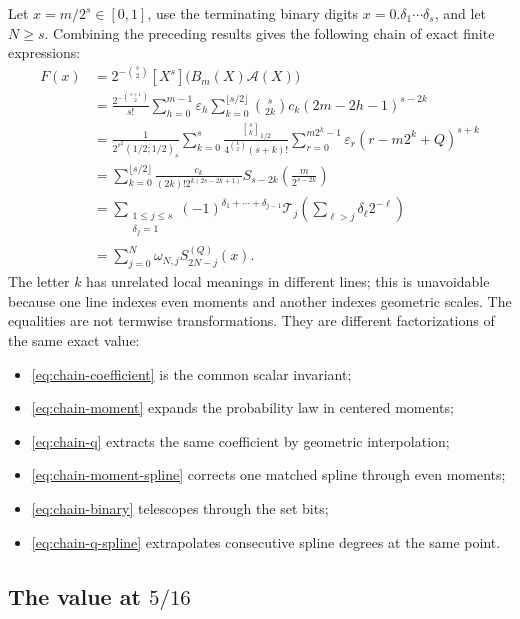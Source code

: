 \documentclass[11pt,oneside]{article}
\theoremstyle{definition}
\theoremstyle{remark}
\newcommand{\qbinom}[3]{\genfrac{[}{]}{0pt}{}{#1}{#2}_{#3}}
\newcommand{\tm}{\varepsilon}
\begin{document}
Let $x=m/2^s\in[0,1]$, use the terminating binary digits
$x=0.\delta_1\cdots\delta_s$, and let $N\ge s$.  Combining the preceding results gives the
following chain of exact finite expressions:
\begin{align}
 F(x)
 &=2^{-\binom s2}[X^s]\bigl(B_m(X)\mathscr A(X)\bigr)     \label{eq:chain-coefficient}\\
 &=\frac{2^{-\binom{s+1}{2}}}{s!}
   \sum_{h=0}^{m-1}\tm_h
   \sum_{k=0}^{\lfloor s/2\rfloor}
   \binom s{2k}c_k(2m-2h-1)^{s-2k}                       \label{eq:chain-moment}\\
 &=\frac{1}{2^{s^2}(1/2;1/2)_s}
   \sum_{k=0}^{s}\frac{\qbinom sk{1/2}}{4^{\binom k2}(s+k)!}
   \sum_{r=0}^{m2^k-1}\tm_r(r-m2^k+Q)^{s+k}              \label{eq:chain-q}\\
 &=\sum_{k=0}^{\lfloor s/2\rfloor}
   \frac{c_k}{(2k)!2^{k(2s-2k+1)}}
   S_{s-2k}\!\left(\frac{m}{2^{s-2k}}\right)             \label{eq:chain-moment-spline}\\
 &=\sum_{\substack{1\le j\le s\\\delta_j=1}}
   (-1)^{\delta_1+\cdots+\delta_{j-1}}
   \mathcal T_j\!\left(\sum_{\ell>j}\delta_\ell2^{-\ell}\right) \label{eq:chain-binary}\\
 &=\sum_{j=0}^{N}\omega_{N,j}S_{2N-j}^{(Q)}(x).           \label{eq:chain-q-spline}
\end{align}
The letter $k$ has unrelated local meanings in different lines; this is unavoidable because
one line indexes even moments and another indexes geometric scales.  The equalities are not
termwise transformations.  They are different factorizations of the same exact value:
\begin{itemize}
\item \eqref{eq:chain-coefficient} is the common scalar invariant;
\item \eqref{eq:chain-moment} expands the probability law in centered moments;
\item \eqref{eq:chain-q} extracts the same coefficient by geometric interpolation;
\item \eqref{eq:chain-moment-spline} corrects one matched spline through even moments;
\item \eqref{eq:chain-binary} telescopes through the set bits;
\item \eqref{eq:chain-q-spline} extrapolates consecutive spline degrees at the same point.
\end{itemize}

\subsection[The value at 5/16]{The value at $5/16$}
\end{document}
